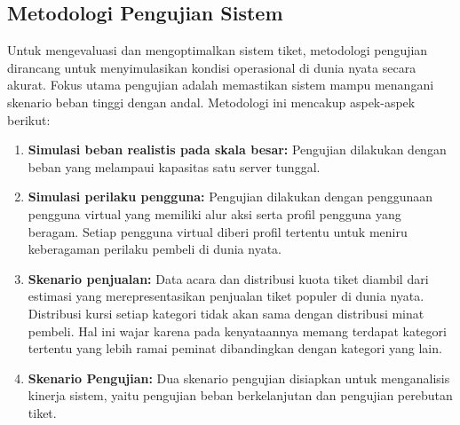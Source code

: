 \subsection{Metodologi Pengujian Sistem}

Untuk mengevaluasi dan mengoptimalkan sistem tiket, metodologi pengujian dirancang untuk menyimulasikan kondisi operasional di dunia nyata secara akurat. Fokus utama pengujian adalah memastikan sistem mampu menangani skenario beban tinggi dengan andal. Metodologi ini mencakup aspek-aspek berikut:

\begin{enumerate}
    \item \textbf{Simulasi beban realistis pada skala besar:} Pengujian dilakukan dengan beban yang melampaui kapasitas satu server tunggal.
    \item \textbf{Simulasi perilaku pengguna:} Pengujian dilakukan dengan penggunaan pengguna virtual yang memiliki alur aksi serta profil pengguna yang beragam. Setiap pengguna virtual diberi profil tertentu untuk meniru keberagaman perilaku pembeli di dunia nyata.
    \item \textbf{Skenario penjualan:} Data acara dan distribusi kuota tiket diambil dari estimasi yang merepresentasikan penjualan tiket populer di dunia nyata. Distribusi kursi setiap kategori tidak akan sama dengan distribusi minat pembeli. Hal ini wajar karena pada kenyataannya memang terdapat kategori tertentu yang lebih ramai peminat dibandingkan dengan kategori yang lain.
    \item \textbf{Skenario Pengujian:} Dua skenario pengujian disiapkan untuk menganalisis kinerja sistem, yaitu pengujian beban berkelanjutan dan pengujian perebutan tiket.
\end{enumerate}
